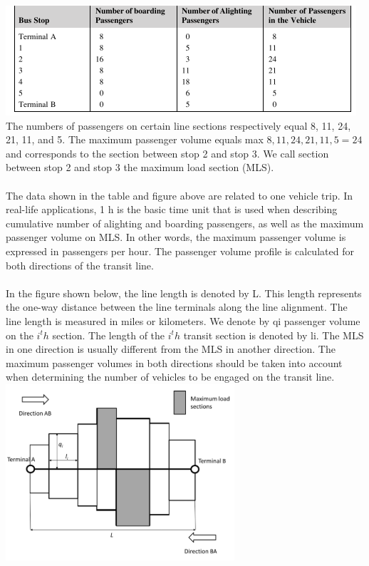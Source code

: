 \includegraphics{gfx/fig23.png}\\
%
The numbers of passengers on certain line sections respectively equal 8, 11, 24, 21, 11, and 5. The maximum passenger volume equals max ${8, 11, 24, 21, 11, 5} = 24$ and corresponds to the section between stop 2 and stop 3. We call section between stop 2 and stop 3 the maximum load section (MLS).\\\\
The data shown in the table and figure above are related to one vehicle trip. In real-life applications, 1 h is the basic time unit that is used when describing cumulative number of alighting and boarding passengers, as well as the maximum passenger volume on MLS. In other words, the maximum passenger volume is expressed in passengers per hour. The passenger volume profile is calculated for both directions of the transit line.\\\\
In the figure shown below, the line length is denoted by L. This length represents the one-way distance between the line terminals along the line alignment. The line length is measured in miles or kilometers. We denote by qi passenger volume on the $ i^th $ section. The length of the $ i^th $ transit section is denoted by li. The MLS in one direction is usually different from the MLS in another direction. The maximum passenger volumes in both directions should be taken into account when determining the number of vehicles to be engaged on the transit line.\\
\includegraphics{gfx/fig22.png}
%
